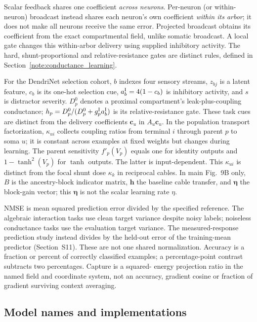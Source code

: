 Scalar feedback shares one coefficient \emph{across neurons}. Per-neuron
(or within-neuron) broadcast instead shares each neuron's own coefficient
\emph{within its arbor}; it does not make all neurons receive the same
error. Projected broadcast obtains its coefficient from the exact
compartmental field, unlike somatic broadcast. A local gate changes this
within-arbor delivery using supplied inhibitory activity. The hard,
shunt-proportional and relative-resistance gates are distinct rules,
defined in Section~\ref{note:conductance_learning}.

For the DendriNet selection cohort, $b$ indexes four sensory streams,
$z_{bj}$ is a latent feature, $c_b$ is its one-hot selection cue,
$a_b^{\rm I}=4(1-c_b)$ is inhibitory activity, and $s$ is distractor severity.
$D_p^0$ denotes a proximal compartment's leak-plus-coupling conductance;
$h_p=D_p^0/(D_p^0+g_p^{\rm I}a_b^{\rm I})$ is its relative-resistance gate. These task cues are
distinct from the delivery coefficients $\bm c_u$ in $A_u\bm c_u$.
In the population transport factorization, $\kappa_{ui}$ collects coupling
ratios from terminal $i$ through parent $p$ to soma $u$; it is constant across
examples at fixed weights but changes during learning. The parent sensitivity
$f'_p(V_p)$ equals one for identity outputs and $1-\tanh^2(V_p)$ for
$\tanh$ outputs. The latter is input-dependent. This $\kappa_{ui}$ is distinct
from the focal shunt dose $\kappa_k$ in reciprocal cables.
In main Fig.~9B only, $B$ is the ancestry-block indicator matrix,
$\bm h$ the baseline cable transfer, and $\bm\eta$ the block-gain vector;
this $\bm\eta$ is not the scalar learning rate $\eta$.

NMSE is mean squared prediction error divided by the specified reference.
The algebraic interaction tasks use clean target variance despite noisy
labels; noiseless conductance tasks use the evaluation target variance.
The measured-response prediction study instead divides by the held-out error
of the training-mean predictor (Section~S11). These are not one shared normalization.
Accuracy is a fraction or percent of correctly classified examples; a
percentage-point contrast subtracts two percentages. Capture is a squared-
energy projection ratio in the named field and coordinate system, not an
accuracy, gradient cosine or fraction of gradient surviving context averaging.

\subsection*{Model names and implementations}

